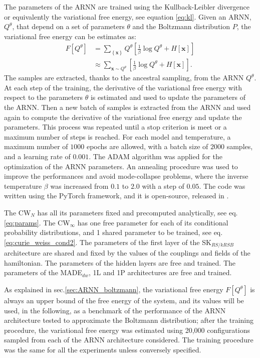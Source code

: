 \documentclass[aps,physrev,10pt,floatfix,reprint]{revtex4-2}
\begin{document}
The parameters of the ARNN are trained using the Kullback-Leibler divergence or equivalently the variational free energy, see equation \ref{eq:kl}. Given an ARNN, $Q^{\theta}$, that depend on a set of parameters $\theta$ and the Boltzmann distribution $P$, the variational free energy can be estimates as:
\begin{align*}
F[Q^{\theta}] & = \sum_{\left\{ \mathbf{x} \right\}}Q^{\theta}\left[\frac{1}{\beta}\log Q^{\theta} + H[\mathbf{x}] \right]\\
& \approx \sum_{\mathbf{x} \sim Q^{\theta}} \left[ \frac{1}{\beta}\log Q^{\theta} + H[\mathbf{x}]\right].
\end{align*}
The samples are extracted, thanks to the ancestral sampling, from the ARNN $Q^{\theta}$. At each step of the training, the derivative of the variational free energy with respect to the parameters $\theta$ is estimated and used to update the parameters of the ARNN. Then a new batch of samples is extracted from the ARNN and used again to compute the derivative of the variational free energy and update the parameters\cite{Wu2019}. This process was repeated until a stop criterion is meet or a maximum number of steps is reached. For each model and temperature, a maximum number of $1000$ epochs are allowed, with a batch size of $2000$ samples, and a learning rate of $0.001$. The ADAM algorithm\cite{kingma2014adam} was applied for the optimization of the ARNN parameters. An annealing procedure was used to improve the performances and avoid mode-collapse problems\cite{Wu2019}, where the inverse temperature $\beta$ was increased from $0.1$ to $2.0$ with a step of $0.05$. The code was written using the PyTorch framework\cite{NEURIPS2019_bdbca288}, and it is open-source, released in \cite{mygithub}.

The CW$_N$ has all its parameters fixed and precomputed analytically, see eq.\ref{eq:params}. The CW$_{\infty}$ has one free parameter for each of its conditional probability distributions, and 1 shared parameter to be trained, see eq.\ref{eq:curie_weiss_cond2}. The parameters of the first layer of the SK$_{RS/kRSB}$ architecture are shared and fixed by the values of the couplings and fields of the hamiltonian. The parameters of the hidden layers are free and trained. The parameters of the MADE$_{dw}$, 1L and 1P architectures are free and trained.


As explained in sec.\ref{sec:ARNN_boltzmann}, the variational free energy $F[Q^{\theta}]$ is always an upper bound of the free energy of the system, and its values will be used, in the following, as a benchmark of the performance of the ARNN architecture tested to approximate the Boltzmann distribution; after the training procedure, the variational free energy was estimated using 20,000 configurations sampled from each of the ARNN architecture considered. 
The training procedure was the same for all the experiments unless conversely specified.
\end{document}
